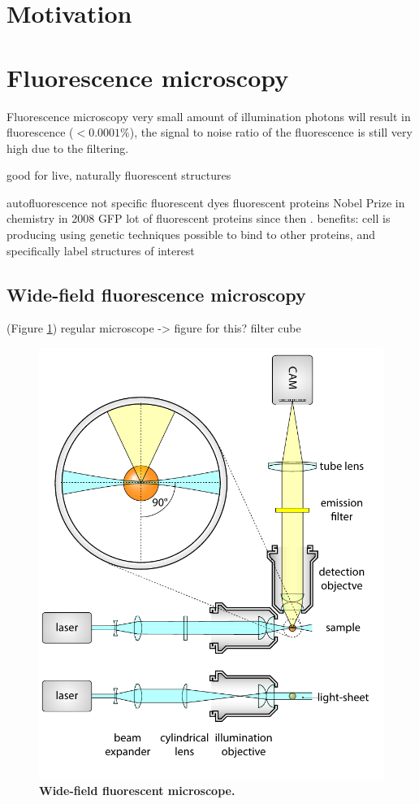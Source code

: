 \documentclass{diploma_style}
\begin{document}
\section{Motivation}

\section{Fluorescence microscopy}
Fluorescence microscopy \cite{lichtman_fluorescence_2005} 
 very small amount of illumination photons will result in fluorescence ($<0.0001\%$), the signal to noise ratio of the fluorescence is still very high due to the filtering.

good for live, naturally fluorescent structures

autofluorescence not specific
fluorescent dyes
fluorescent proteins
Nobel Prize in chemistry in 2008 GFP \cite{service_three_2008}
lot of fluorescent proteins since then \cite{shaner_guide_2005}. 
benefits: cell is producing
using genetic techniques possible to bind to other proteins, and specifically label structures of interest

\subsection{Wide-field fluorescence microscopy}
(Figure \ref{fig:wide-field})
regular microscope -> figure for this?
filter cube

\begin{figure}[htbp]
	\centering
	\includegraphics[page=4,scale=0.8]{figures/1_spim/spim_cyl}
	\caption{\textbf{Wide-field fluorescent microscope.}}
	\label{fig:wide-field}
\end{figure}
\end{document}

